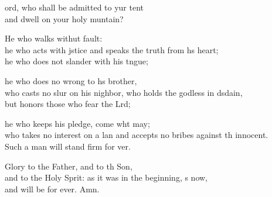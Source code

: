 \settowidth{\versewidth}{and accepts no bribes against the innocent.   *}
\begin{psalmverse}%
  \begin{patverse}
ord, who shall be admitted to yur tent\Med\\
and dwell on your holy muntain?

He who walks withut fault:\Med\\
he who acts with jstice
and speaks the truth from h\pointup{\i}s heart;\Med\\
he who does not slander with his tngue;

he who does no wrong to h\pointup{\i}s brother,\Med\\
who casts no slur on his nighbor,
who holds the godless in d\pointup{\i}sdain,\Med\\
but honors those who fear the Lrd;

he who keeps his pledge, come wht may;\Med\\
who takes no interest on a lan
and accepts no bribes against th innocent.\Med\\
Such a man will stand firm for ver.

Glory to the Father, and to th Son,\Med\\
and to the Holy Sp\pointup{\i}rit:
as it was in the beginning, \pointup{\i}s now,\Med\\
and will be for ever. Amn.
  \end{patverse}
\end{psalmverse}
